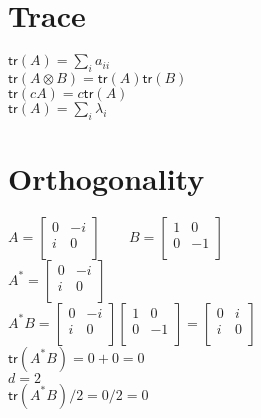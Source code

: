\documentclass{iansnotes}
\begin{document}
\section{Trace}
$\textsf{tr}(A) = \sum_i a_{ii}$ \\[4mm]
$\textsf{tr}(A \otimes B) = \textsf{tr}(A) \textsf{tr}(B)$\\[4mm]
$\textsf{tr}(cA) = c\textsf{tr}(A)$\\[4mm]
$\textsf{tr}(A) = \sum_i \lambda_i$

\section{Orthogonality}
$A = \begin{bmatrix}
  0 & -i \\
  i & 0 \\
\end{bmatrix}\qquad B = \begin{bmatrix}
  1 & 0 \\
  0 & -1 \\
\end{bmatrix}$ \\[4mm]
$A^* = \begin{bmatrix}
  0 & -i \\
  i & 0 \\
\end{bmatrix}$ \\[4mm]
$A^*B = \begin{bmatrix}
  0 & -i \\
  i & 0 \\
\end{bmatrix}\begin{bmatrix}
  1 & 0 \\
  0 & -1 \\
\end{bmatrix}=\begin{bmatrix}
  0 & i \\
  i & 0 \\
\end{bmatrix}$ \\[4mm]
$\textsf{tr}(A^*B) = 0 + 0 = 0$ \\[2mm]
$d = 2$ \\[2mm]
$\textsf{tr}(A^*B)/2 = 0/2 = 0$
\end{document}

